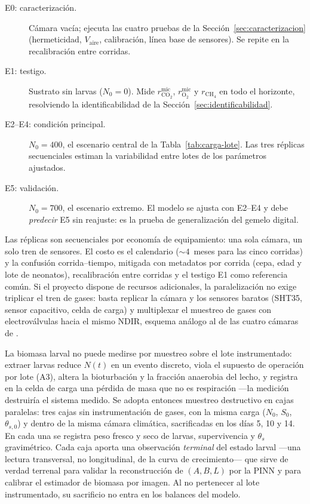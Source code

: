 \begin{description}
  \item[E0: caracterización.] Cámara vacía; ejecuta las cuatro pruebas de la
  Sección~\ref{sec:caracterizacion} (hermeticidad, $V_{\mathrm{aire}}$,
  calibración, línea base de sensores). Se repite en la recalibración entre
  corridas.
  \item[E1: testigo.] Sustrato sin larvas ($N_0 = 0$). Mide
  $r^{\mathrm{mic}}_{\mathrm{CO_2}}$, $r^{\mathrm{mic}}_{\mathrm{O_2}}$ y
  $r_{\mathrm{CH_4}}$ en todo el horizonte, resolviendo la identificabilidad
  de la Sección~\ref{sec:identificabilidad}.
  \item[E2--E4: condición principal.] $N_0 = 400$, el escenario central de la
  Tabla~\ref{tab:carga-lote}. Las tres réplicas secuenciales estiman la
  variabilidad entre lotes de los parámetros ajustados.
  \item[E5: validación.] $N_0 = 700$, el escenario extremo. El modelo se
  ajusta con E2--E4 y debe \emph{predecir} E5 sin reajuste: es la prueba de
  generalización del gemelo digital.
\end{description}

\begin{remark}\label{rem:paralelizacion}
Las réplicas son secuenciales por economía de equipamiento: una sola cámara,
un solo tren de sensores. El costo es el calendario ($\sim 4$~meses para las
cinco corridas) y la confusión corrida--tiempo, mitigada con metadatos por
corrida (cepa, edad y lote de neonatos), recalibración entre corridas y el
testigo E1 como referencia común. Si el proyecto dispone de recursos
adicionales, la paralelización no exige triplicar el tren de gases: basta
replicar la cámara y los sensores baratos (SHT35, sensor capacitivo, celda de
carga) y multiplexar el muestreo de gases con electroválvulas hacia el mismo
NDIR, esquema análogo al de las cuatro cámaras de
\citet{rossiEstimatingDynamicsGreenhouse2024a}.
\end{remark}

\begin{remark}\label{rem:sacrificio}
La biomasa larval no puede medirse por muestreo sobre el lote instrumentado:
extraer larvas reduce $N(t)$ en un evento discreto, viola el supuesto de
operación por lote (A3), altera la bioturbación y la fracción anaerobia del
lecho, y registra en la celda de carga una pérdida de masa que no es
respiración ---la medición destruiría el sistema medido. Se adopta entonces
muestreo destructivo en cajas paralelas: tres cajas sin instrumentación de
gases, con la misma carga ($N_0$, $S_0$, $\theta_{s,0}$) y dentro de la misma
cámara climática, sacrificadas en los días 5, 10 y 14. En cada una se
registra peso fresco y seco de larvas, supervivencia y $\theta_s$
gravimétrico. Cada caja aporta una observación \emph{terminal} del estado
larval ---una lectura transversal, no longitudinal, de la curva de
crecimiento--- que sirve de verdad terrenal para validar la reconstrucción
de $(A, B, L)$ por la PINN y para calibrar el estimador de biomasa por
imagen. Al no pertenecer al lote instrumentado, su sacrificio no entra en
los balances del modelo.
\end{remark}


